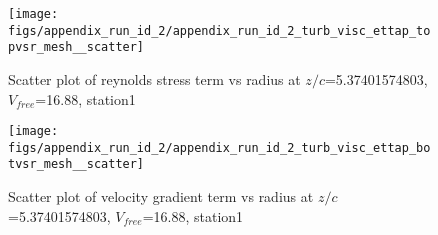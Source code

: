 \begin{figure}[H]
\centering
\texttt{[image: figs/appendix\_run\_id\_2/appendix\_run\_id\_2\_turb\_visc\_ettap\_topvsr\_mesh\_\_scatter]}
\caption{Scatter plot of reynolds stress term vs radius at $z/c$=5.37401574803, $V_{free}$=16.88, station1}
\label{fig:appendix_run_id_2_turb_visc_ettap_topvsr_mesh__scatter}
\end{figure}


\begin{figure}[H]
\centering
\texttt{[image: figs/appendix\_run\_id\_2/appendix\_run\_id\_2\_turb\_visc\_ettap\_botvsr\_mesh\_\_scatter]}
\caption{Scatter plot of velocity gradient term vs radius at $z/c$=5.37401574803, $V_{free}$=16.88, station1}
\label{fig:appendix_run_id_2_turb_visc_ettap_botvsr_mesh__scatter}
\end{figure}


